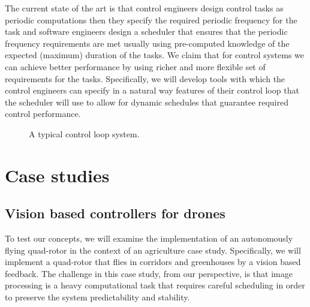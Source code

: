 \documentclass[11pt]{article}
\begin{document}
The current state of the art is that control engineers design control tasks as periodic computations then they specify the required periodic frequency for the task and software engineers design a scheduler that ensures that the periodic frequency requirements are met usually using pre-computed knowledge of the expected (maximum) duration of the tasks.
We claim that for control systems we can achieve better performance by using richer and more flexible set of requirements for the tasks. Specifically, we will develop tools with which the control engineers can specify in a natural way features of their control loop that the scheduler will use to allow for dynamic schedules that guarantee required control performance. 

\begin{figure}[]
    \centering
    
    
    \caption{A typical control loop system.
    \label{fig:control loop}}
\end{figure}




\section{Case studies}
\label{sec:Case study}

\subsection{Vision based controllers for drones}
To test our concepts, we will examine the implementation of an autonomously flying quad-rotor in the context of an agriculture case study. Specifically, we will implement a quad-rotor that flies in corridors and greenhouses by a vision based feedback. The challenge in this case study, from our perspective, is that image processing is a heavy computational task that requires careful scheduling in order to preserve the system predictability and stability.
\end{document}
